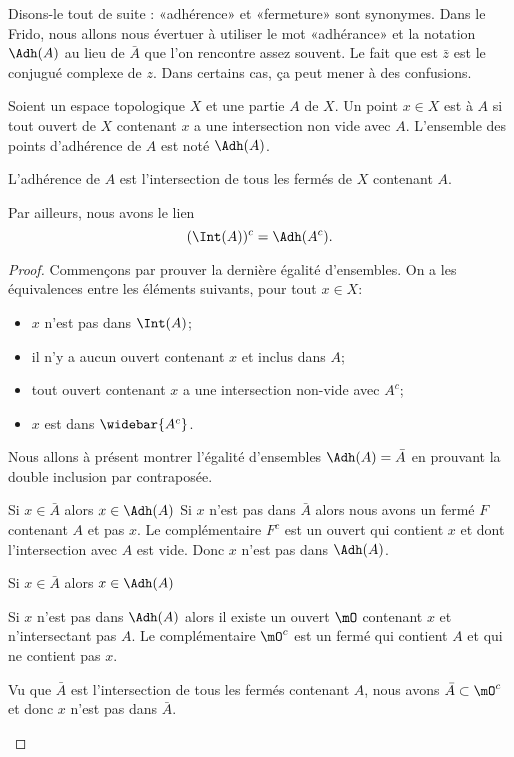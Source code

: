 Disons-le tout de suite : «adhérence» et «fermeture» sont synonymes. Dans le Frido, nous allons nous évertuer à utiliser le mot «adhérance» et la notation \( \Adh(A)\) au lieu de \( \bar A\) que l'on rencontre assez souvent. Le fait que est \( \bar z\) est le conjugué complexe de \( z\). Dans certains cas, ça peut mener à des confusions.
\begin{definition}      \label{DEFooSVWMooLpAVZR}
    Soient un espace topologique \( X\) et une partie \( A\) de \( X\). Un point \( x\in X\) est  à \( A\) si tout ouvert de \( X\) contenant \( x\) a une intersection non vide avec \( A\). L'ensemble des points d'adhérence de \( A\) est noté $\Adh(A)$.
\end{definition}

\begin{lemma}       \label{LEMooILNCooOFZaTe}
    L'adhérence de \( A\) est l'intersection de tous les fermés de \( X\) contenant \( A\).

    Par ailleurs, nous avons le lien
    \begin{equation}
      (\Int(A))^c = \Adh(A^c).
    \end{equation}
\end{lemma}

\begin{proof}
    Commençons par prouver la dernière égalité d'ensembles. On a les équivalences entre les éléments suivants, pour tout $x \in X$:
    \begin{itemize}
    \item $x$ n'est pas dans $\Int(A)$;
    \item il n'y a aucun ouvert contenant $x$ et inclus dans $A$;
    \item tout ouvert contenant $x$ a une intersection non-vide avec $A^c$;
    \item $x$ est dans $\widebar{A^c}$.
    \end{itemize}
    Nous allons à présent montrer l'égalité d'ensembles \( \Adh(A)=\bar A \) en prouvant la double inclusion par contraposée.
    \begin{subproof}
        \item[Si \( x\in \bar A\) alors \( x\in\Adh(A)\)]
            Si \( x\) n'est pas dans \( \bar A\) alors nous avons un fermé \( F\) contenant \( A\) et pas \( x\). Le complémentaire \( F^c\) est un ouvert qui contient \( x\) et dont l'intersection avec \( A\) est vide. Donc \( x\) n'est pas dans \( \Adh(A)\).

        \item[Si \( x\in\bar A\) alors \( x\in \Adh(A)\)]

            Si \( x\) n'est pas dans \( \Adh(A)\) alors il existe un ouvert \( \mO\) contenant \( x\) et n'intersectant pas \( A\). Le complémentaire \( \mO^c\) est un fermé qui contient \( A\) et qui ne contient pas \( x\).

            Vu que \( \bar A\) est l'intersection de tous les fermés contenant \( A\), nous avons \( \bar A\subset\mO^c\) et donc \( x\) n'est pas dans \( \bar A\).
    \end{subproof}
\end{proof}

